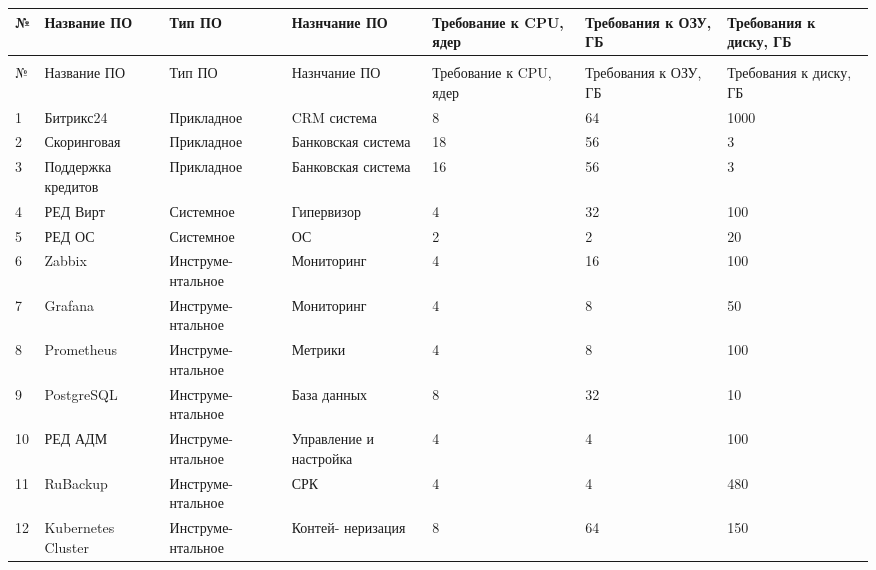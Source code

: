 \documentclass[14pt, a4paper]{extarticle}
\begin{document}
\begin{tabularx}{\textwidth}{|l|X|X|X|X|X|X|}
  \caption{Общие системные требования\label{tab:summary-system-requirements}}                                                                    \\
  \hline
  №  & Название ПО        & Тип ПО             & Назнчание ПО           & Требование к CPU, ядер & Требования к ОЗУ, ГБ & Требования к диску, ГБ \\ \hline
  \endfirsthead
  \caption*{Продолжение таблицы~\ref{tab:summary-system-requirements}}                                                                           \\
  \hline
  №  & Название ПО        & Тип ПО             & Назнчание ПО           & Требование к CPU, ядер & Требования к ОЗУ, ГБ & Требования к диску, ГБ \\ \hline
  \endhead
  \endfoot
  \endlastfoot

  1  & Битрикс24          & Прикладное         & CRM система            & 8                      & 64                   & 1000                   \\ \hline
  2  & Скоринговая        & Прикладное         & Банковская система     & 18                     & 56                   & 3                      \\ \hline
  3  & Поддержка кредитов & Прикладное         & Банковская система     & 16                     & 56                   & 3                      \\ \hline
  4  & РЕД Вирт           & Системное          & Гипервизор             & 4                      & 32                   & 100                    \\ \hline
  5  & РЕД ОС             & Системное          & ОС                     & 2                      & 2                    & 20                     \\ \hline
  6  & Zabbix             & Инструме- нтальное & Мониторинг             & 4                      & 16                   & 100                    \\ \hline
  7  & Grafana            & Инструме- нтальное & Мониторинг             & 4                      & 8                    & 50                     \\ \hline
  8  & Prometheus         & Инструме- нтальное & Метрики                & 4                      & 8                    & 100                    \\ \hline
  9  & PostgreSQL         & Инструме- нтальное & База данных            & 8                      & 32                   & 10                     \\ \hline
  10 & РЕД АДМ            & Инструме- нтальное & Управление и настройка & 4                      & 4                    & 100                    \\ \hline
  11 & RuBackup           & Инструме- нтальное & СРК                    & 4                      & 4                    & 480                    \\ \hline
  12 & Kubernetes Cluster & Инструме- нтальное & Контей- неризация      & 8                      & 64                   & 150                    \\ \hline
\end{tabularx}
\end{document}
